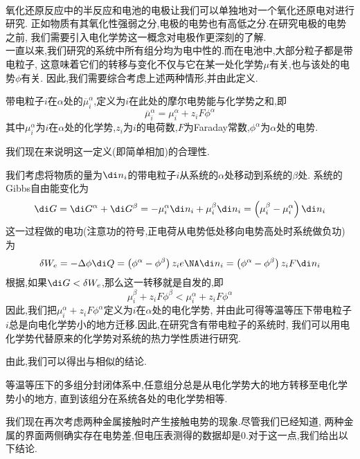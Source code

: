 \documentclass{ctexart}
\begin{document}
\pagestyle{plain}
\noindent{}\vspace{15pt}\\
\indent 氧化还原反应中的半反应和电池的电极让我们可以单独地对一个氧化还原电对进行研究.%
正如物质有其氧化性强弱之分,电极的电势也有高低之分.在研究电极的电势之前,%
我们需要引入电化学势这一概念对电极作更深刻的了解.\vspace{12pt}\\
\indent 一直以来,我们研究的系统中所有组分均为电中性的.而在电池中,大部分粒子都是带电粒子,%
这意味着它们的转移与变化不仅与它在某一处化学势$\mu$有关,也与该处的电势$\phi$有关.%
因此,我们需要综合考虑上述两种情形,并由此定义.
\begin{definition}[6D.1.1 电化学势]
    带电粒子$i$在$\alpha$处的$\overline{\mu}_i^\alpha$,定义为$i$在此处的摩尔电势能与化学势之和,即
    \[\overline{\mu}_i^\alpha=\mu_i^\alpha+z_iF\phi^\alpha\]
    其中$\mu_i^\alpha$为$i$在$\alpha$处的化学势,$z_i$为$i$的电荷数,$F$为Faraday常数,$\phi^\alpha$为$\alpha$处的电势.
\end{definition}
我们现在来说明这一定义(即简单相加)的合理性.
\begin{derivation}
    我们考虑将物质的量为$\di n_i$的带电粒子$i$从系统的$\alpha$处移动到系统的$\beta$处.%
    系统的Gibbs自由能变化为
    \[\di G=\di G^\alpha+\di G^\beta=-\mu_i^\alpha\di n_i+\mu_i^\beta\di n_i=\left(\mu_i^\beta-\mu_i^\alpha\right)\di n_i\]
    这一过程做的电功(注意功的符号,正电荷从电势低处移向电势高处时系统做负功)为
    \[\delta W_e=-\Delta\phi\di Q=\left(\phi^\alpha-\phi^\beta\right)z_ie\NA\di n_i=\left(\phi^\alpha-\phi^\beta\right)z_iF\di n_i\]
    根据,如果$\di G<\delta W_e$,那么这一转移就是自发的,即
    \[\mu_i^\beta+z_iF\phi^\beta<\mu_i^\alpha+z_iF\phi^\alpha\]
    因此,我们把$\mu_i^\alpha+z_iF\phi^\alpha$定义为$i$在$\alpha$处的电化学势,%
    并由此可得等温等压下带电粒子$i$总是向电化学势小的地方迁移.因此,在研究含有带电粒子的系统时,%
    我们可以用电化学势代替原来的化学势对系统的热力学性质进行研究.
\end{derivation}
由此,我们可以得出与相似的结论.
\begin{definition}[6D.1.2 含带电粒子的多组分体系自发变化的方向]
    等温等压下的多组分封闭体系中,任意组分总是从电化学势大的地方转移至电化学势小的地方,%
    直到该组分在系统各处的电化学势相等.
\end{definition}
我们现在再次考虑两种金属接触时产生接触电势的现象.尽管我们已经知道,%
两种金属的界面两侧确实存在电势差,但电压表测得的数据却是$0$.对于这一点,我们给出以下结论.
\end{document}
